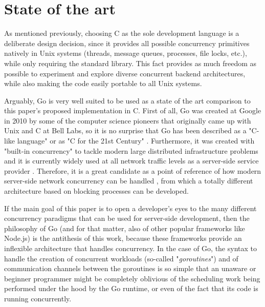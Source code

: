 \section{State of the art}
As mentioned previously, choosing C as the sole development language is a deliberate design decision, since it provides all possible concurrency primitives natively in Unix systems (threads, message queues, processes, file locks, etc.), while only requiring the standard library. This fact provides as much freedom as possible to experiment and explore diverse concurrent backend architectures, while also making the code easily portable to all Unix systems.

Arguably, Go is very well suited to be used as a state of the art comparison to this paper's proposed implementation in C. First of all, Go was created at Google in 2010 by some of the computer science pioneers that originally came up with Unix and C at Bell Labs, so it is no surprise that Go has been described as a "C-like language" or as "C for the 21st Century" \cite{GoPL2015}. Furthermore, it was created with "built-in concurrency" to tackle modern large distributed infrastructure problems and it is currently widely used at all network traffic levels as a server-side service provider \cite{Pike2012}\cite{Ajmani2016}. Therefore, it is a great candidate as a point of reference of how modern server-side network concurrency can be handled \cite{GoArticleACM}, from which a totally different architecture based on blocking processes can be developed. 

If the main goal of this paper is to open a developer's eyes to the many different concurrency paradigms that can be used for server-side development, then the philosophy of Go (and for that matter, also of other popular frameworks like Node.js) is the antithesis of this work, because these frameworks provide an inflexible architecture that handles concurrency. In the case of Go, the syntax to handle the creation of concurrent workloads (so-called "\textit{goroutines}") and of communication channels between the goroutines is so simple that an unaware or beginner programmer might be completely oblivious of the scheduling work being performed under the hood by the Go runtime, or even of the fact that its code is running concurrently. 

